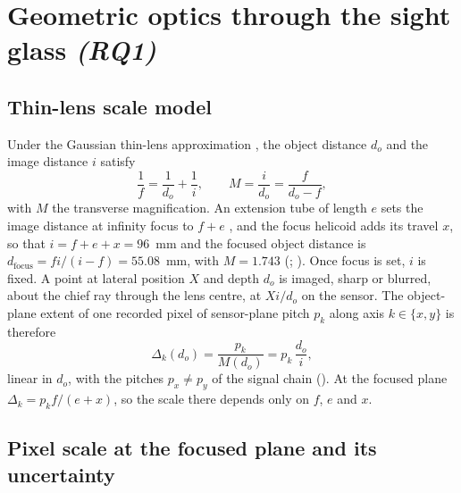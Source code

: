 \section{Geometric optics through the sight glass \emph{(RQ1)}}\label{sec:optics}

\subsection{Thin-lens scale model}\label{sec:thinlens}

Under the Gaussian thin-lens approximation \citep[\S\,5.2]{Hecht2017}, the object distance $d_o$ and the image
distance $i$ satisfy
\begin{equation}\label{eq:thinlens}
\frac{1}{f} = \frac{1}{d_o} + \frac{1}{i}, \qquad M = \frac{i}{d_o} = \frac{f}{d_o - f},
\end{equation}
with $M$ the transverse magnification. An extension tube of length $e$ sets the image distance at infinity focus
to $f + e$ \citep{PhotonsToPhotos2024}, and the focus helicoid adds its travel $x$, so that
$i = f + e + x = 96$~mm and the focused object distance is $d_\mathrm{focus} = f i / (i - f) = 55.08$~mm, with
$M = 1.743$ (; ). Once focus is set, $i$ is fixed. A point
at lateral position $X$ and depth $d_o$ is imaged, sharp or blurred, about the chief ray through the lens centre,
at $X i / d_o$ on the sensor. The object-plane extent of one recorded pixel of sensor-plane pitch $p_k$ along axis
$k \in \{x, y\}$ is therefore
\begin{equation}\label{eq:pixelsize}
\Delta_k(d_o) = \frac{p_k}{M(d_o)} = p_k \, \frac{d_o}{i},
\end{equation}
linear in $d_o$, with the pitches $p_x \neq p_y$ of the signal chain (). At
the focused plane $\Delta_k = p_k f / (e + x)$, so the scale there depends only on $f$, $e$ and
$x$.
\subsection{Pixel scale at the focused plane and its uncertainty}\label{sec:budget}

